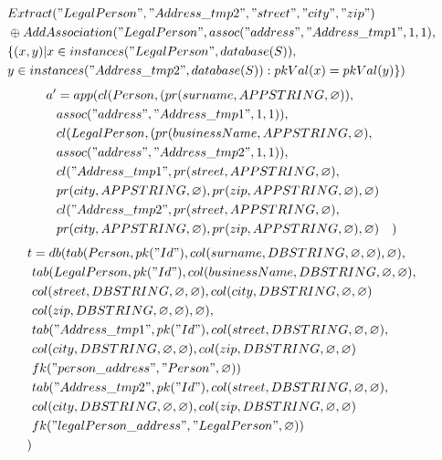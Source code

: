 \documentclass[11pt]{article}
\begin{document}
\newpage
\begin{align*}
& Extract("LegalPerson", "Address\_tmp2", "street", "city", "zip")  \\
& \oplus AddAssociation("LegalPerson", assoc("address", "Address\_tmp1", 1, 1),\\ 
& \{(x,y)| x \in instances("LegalPerson", database(S)), \\
& y \in instances("Address\_tmp2", database(S)) : pkVal(x) = pkVal(y) \}) \\
\end{align*}
\hline
\begin{align*}
a' &= app(cl(Person, (pr(surname, APPSTRING, \varnothing)), \\ 
& assoc("address", "Address\_tmp1", 1, 1)), \\ 
& cl(LegalPerson, (pr(businessName, APPSTRING, \varnothing),\\
& assoc("address", "Address\_tmp2", 1, 1)), \\
& cl("Address\_tmp1", pr(street, APPSTRING, \varnothing), \\
& pr(city, APPSTRING, \varnothing), pr(zip, APPSTRING, \varnothing), \varnothing) \\
& cl("Address\_tmp2", pr(street, APPSTRING, \varnothing), \\
& pr(city, APPSTRING, \varnothing), pr(zip, APPSTRING, \varnothing), \varnothing)
& )
\end{align*}
\begin{align*}
t &= db(tab(Person, pk("Id"), col(surname, DBSTRING, \varnothing, \varnothing), \varnothing), \\
& tab(LegalPerson, pk("Id"),  col(businessName, DBSTRING, \varnothing, \varnothing), \\
& col(street, DBSTRING, \varnothing, \varnothing), col(city, DBSTRING, \varnothing, \varnothing) \\
& col(zip, DBSTRING, \varnothing, \varnothing), \varnothing), \\
& tab("Address\_tmp1", pk("Id"), col(street, DBSTRING, \varnothing, \varnothing),\\
& col(city, DBSTRING, \varnothing, \varnothing), col(zip, DBSTRING, \varnothing, \varnothing) \\
& fk("person\_address", "Person", \varnothing))\\
& tab("Address\_tmp2", pk("Id"), col(street, DBSTRING, \varnothing, \varnothing),\\
& col(city, DBSTRING, \varnothing, \varnothing), col(zip, DBSTRING, \varnothing, \varnothing) \\
& fk("legalPerson\_address", "LegalPerson", \varnothing))\\
) 
\end{align*}
\end{document}
